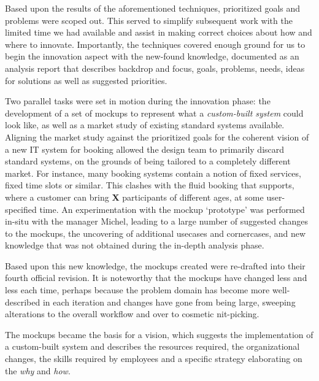 Based upon the results of the aforementioned techniques, prioritized goals and
problems were scoped out. This served to simplify subsequent work with the
limited time we had available and assist in making correct choices about how and
where to innovate. Importantly, the techniques covered enough ground for us to
begin the innovation aspect with the new-found knowledge, documented as an
analysis report\cite[p. 159]{bodker2004participatory} that describes backdrop
and focus, goals, problems, needs, ideas for solutions as well as suggested
priorities.

Two parallel tasks were set in motion during the innovation phase: the
development of a set of mockups to represent what a \textit{custom-built system}
could look like, as well as a market study of existing standard systems
available. Aligning the market study against the prioritized goals for the
coherent vision of a new IT system for booking allowed the design team to
primarily discard standard systems, on the grounds of being tailored to a
completely different market. For instance, many booking systems contain a notion
of fixed services, fixed time slots or similar. This clashes with the fluid
booking that \gomonkey{} supports, where a customer can bring \textbf{X}
participants of different ages, at some user-specified time. An experimentation
with the mockup `prototype' was performed in-situ with the manager Michel, 
leading to a large number of suggested changes to the mockups, the uncovering of
additional usecases and cornercases, and new knowledge that was not obtained
during the in-depth analysis phase.

Based upon this new knowledge, the mockups created were re-drafted into their
fourth official revision. It is noteworthy that the mockups have changed less
and less each time, perhaps because the problem domain has become more
well-described in each iteration and changes have gone from being large,
sweeping alterations to the overall workflow and over to cosmetic nit-picking.

The mockups became the basis for a vision, which suggests the implementation of
a custom-built system and describes the resources required, the organizational
changes, the skills required by employees and a specific strategy elaborating on
the \textit{why} and \textit{how}.

